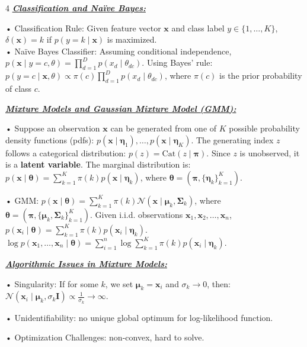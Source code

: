 \documentclass[10pt]{article}
\newcommand{\bulletPoint}[1]{\ul{\textit{\textbf{#1}}}}
\begin{document}
\begin{multicols*}{4}
\bulletPoint{Classification and Naïve Bayes:}\quad

• Classification Rule: Given feature vector $\mathbf{x}$ and class label $y \in \{1, \dots, K\}$,
$\delta(\mathbf{x}) = k$ if $p(y = k \mid \mathbf{x})$ is maximized. \\
• Naïve Bayes Classifier: Assuming conditional independence,
$p(\mathbf{x} \mid y = c, \theta) = \prod_{d=1}^{D} p(x_d \mid \theta_{dc})$. Using Bayes' rule: $p(y = c \mid \mathbf{x}, \theta) \propto \pi(c) \prod_{d=1}^{D} p(x_d \mid \theta_{dc})$, where $\pi(c)$ is the prior probability of class $c$.


\bulletPoint{Mixture Models and Gaussian Mixture Model (GMM):}\quad

• Suppose an observation $\mathbf{x}$ can be generated from one of $K$ possible probability density functions (pdfs):
 $p(\mathbf{x} \mid \boldsymbol{\eta}_1), \dots, p(\mathbf{x} \mid \boldsymbol{\eta}_K)$.
The generating index $z$ follows a categorical distribution: $p(z) = \text{Cat}(z \mid \boldsymbol{\pi})$.
Since $z$ is unobserved, it is a \textbf{latent variable}. The marginal distribution is:
 $p(\mathbf{x} \mid \boldsymbol{\theta}) = \sum_{k=1}^{K} \pi(k) p(\mathbf{x} \mid \boldsymbol{\eta}_k)$,
 where $\boldsymbol{\theta} = (\boldsymbol{\pi}, \{ \boldsymbol{\eta}_k \}_{k=1}^{K})$. 

• GMM: $p(\mathbf{x} \mid \boldsymbol{\theta}) = \sum_{k=1}^{K} \pi(k) \mathcal{N} (\mathbf{x} \mid \boldsymbol{\mu}_k, \boldsymbol{\Sigma}_k)$,
 where $\boldsymbol{\theta} = (\boldsymbol{\pi}, \{ \boldsymbol{\mu}_k, \boldsymbol{\Sigma}_k \}_{k=1}^{K})$. 
Given i.i.d. observations $\mathbf{x}_1, \mathbf{x}_2, \dots, \mathbf{x}_n$, $p(\mathbf{x}_i \mid \boldsymbol{\theta}) = \sum_{k=1}^{K} \pi(k) p(\mathbf{x}_i \mid \boldsymbol{\eta}_k)$.\\
$\log p(\mathbf{x}_1, \dots, \mathbf{x}_n \mid \boldsymbol{\theta}) = \sum_{i=1}^{n} \log \sum_{k=1}^{K} \pi(k) p(\mathbf{x}_i \mid \boldsymbol{\eta}_k)$.

\bulletPoint{Algorithmic Issues in Mixture Models:}\quad

• Singularity:
If for some $k$, we set $\boldsymbol{\mu}_k = \mathbf{x}_i$ and $\sigma_k \to 0$, then:
$\mathcal{N}(\mathbf{x}_i \mid \boldsymbol{\mu}_k, \sigma_k \mathbf{I}) \propto \frac{1}{\sigma_k} \to \infty$. 

• Unidentifiability:
no unique global optimum for log-likelihood function. 

• Optimization Challenges: non-convex, hard to solve. 


\end{multicols*}
\end{document}

